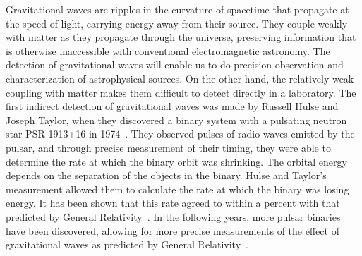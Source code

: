 \newcommand{\FILL}{\textcolor{red}{FILLME}}



Gravitational waves
are ripples in the curvature of spacetime that propagate at the speed of light,
% 
% 
carrying energy away from their source. They couple weakly with matter as 
they propagate through the universe, 
preserving information that is otherwise inaccessible with conventional
electromagnetic astronomy. The detection of gravitational waves will enable 
us to do precision observation and characterization of astrophysical sources. 
On the other hand, the relatively weak coupling with matter makes them
difficult to detect directly in a laboratory.
The first indirect detection of gravitational waves was made by Russell Hulse 
and Joseph Taylor, when they discovered a binary system with a pulsating neutron
star PSR 1913+16 in 1974~\cite{hulse}. They observed pulses of radio waves
emitted by the pulsar, and through precise measurement of their timing,
they were able to determine the rate at which the binary orbit was shrinking.
The orbital energy depends on the separation of the objects in 
the binary. Hulse and Taylor's
measurement allowed them to calculate the rate at which the binary 
was losing energy. It has been shown that this rate agreed to within a percent
with that predicted by General Relativity~\cite{Weisberg:1981mt,Taylor:1989}.
In the following years, more pulsar binaries
have been discovered, allowing for more precise measurements of the effect
of gravitational waves as predicted by General Relativity~\cite{Burgay:2003jj}.


